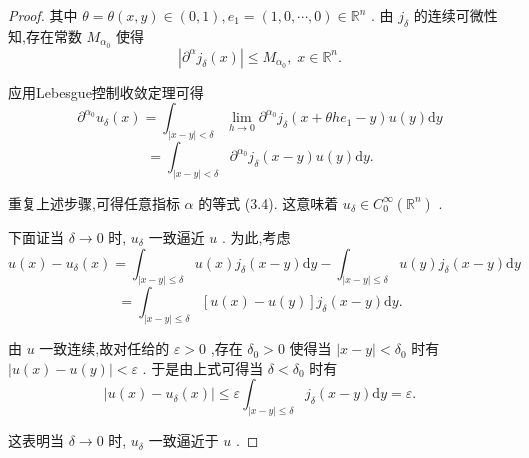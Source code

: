 \documentclass[lang=cn,newtx,10pt,scheme=chinese,thmcnt=chapter]{elegantbook}
\newcommand{\dif}{\mathrm{d}}
\begin{document}
\begin{proof}
其中 \(\theta  = \theta \left( {x,y}\right)  \in  \left( {0,1}\right) ,{e}_{1} = \left( {1,0,\cdots ,0}\right)  \in  {\mathbb{R}}^{n}\) . 由 \({j}_{\delta }\) 的连续可微性知,存在常数 \({M}_{{\alpha }_{0}}\) 使得
\begin{equation*}
\left| {{\partial }^{\alpha }{j}_{\delta }\left( x\right) }\right|  \leqslant  {M}_{{\alpha }_{0}},\;x \in  {\mathbb{R}}^{n}.
\end{equation*}

应用Lebesgue控制收敛定理可得
\begin{equation*}
{\partial }^{{\alpha }_{0}}{u}_{\delta }\left( x\right)  = {\int }_{\left| {x - y}\right|  < \delta }\mathop{\lim }\limits_{{h \rightarrow  0}}{\partial }^{{\alpha }_{0}}{j}_{\delta }\left( {x + {\theta h}{e}_{1} - y}\right) u\left( y\right) {\dif y}
\end{equation*}
\begin{equation*}
= {\int }_{\left| {x - y}\right|  < \delta }{\partial }^{{\alpha }_{0}}{j}_{\delta }\left( {x - y}\right) u\left( y\right) {\dif y}.
\end{equation*}

重复上述步骤,可得任意指标 \(\alpha\) 的等式 (3.4). 这意味着 \({u}_{\delta } \in  {C}_{0}^{\infty }\left( {\mathbb{R}}^{n}\right)\) .

下面证当 \(\delta  \rightarrow  0\) 时, \({u}_{\delta }\) 一致逼近 \(u\) . 为此,考虑
\begin{equation*}
u\left( x\right)  - {u}_{\delta }\left( x\right)  = {\int }_{\left| {x - y}\right|  \leqslant  \delta }u\left( x\right) {j}_{\delta }\left( {x - y}\right) {\dif y} - {\int }_{\left| {x - y}\right|  \leqslant  \delta }u\left( y\right) {j}_{\delta }\left( {x - y}\right) {\dif y}
\end{equation*}
\begin{equation*}
= {\int }_{\left| {x - y}\right|  \leqslant  \delta }\left\lbrack  {u\left( x\right)  - u\left( y\right) }\right\rbrack  {j}_{\delta }\left( {x - y}\right) {\dif y}.
\end{equation*}

由 \(u\) 一致连续,故对任给的 \(\varepsilon  > 0\) ,存在 \({\delta }_{0} > 0\) 使得当 \(\left| {x - y}\right|  < {\delta }_{0}\) 时有 \(\left| {u\left( x\right)  - u\left( y\right) }\right|  < \varepsilon\) . 于是由上式可得当 \(\delta  < {\delta }_{0}\) 时有
\begin{equation*}
\left| {u\left( x\right)  - {u}_{\delta }\left( x\right) }\right|  \leqslant  \varepsilon {\int }_{\left| {x - y}\right|  \leqslant  \delta }{j}_{\delta }\left( {x - y}\right) {\dif y} = \varepsilon .
\end{equation*}

这表明当 \(\delta  \rightarrow  0\) 时, \({u}_{\delta }\) 一致逼近于 \(u\) .

\end{proof}
\end{document}
